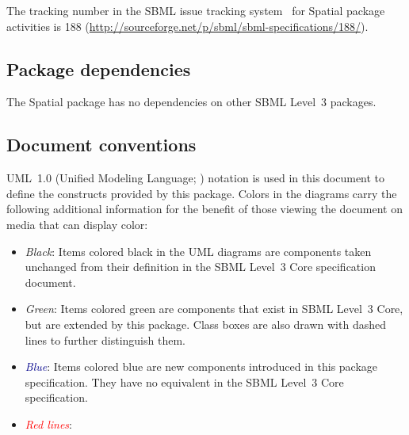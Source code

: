 The tracking number in the SBML issue tracking system~\citep{tracker} for Spatial package activities is 188 (\url{http://sourceforge.net/p/sbml/sbml-specifications/188/}).


\subsection{Package dependencies}

The Spatial package has no dependencies on other SBML Level~3 packages.


\subsection{Document conventions}
\label{conventions}

UML~1.0 (Unified Modeling Language; \citealt{eriksson:1998, oestereich:1999}) notation is used in this document to define the constructs provided by this package.  Colors in the diagrams carry the following additional information for the benefit of those viewing the document on media that can display color:

\begin{itemize}

\item[\raisebox{2.75pt}{\colorbox{black}{\rule{0.8pt}{0.8pt}}}]
  \emph{Black}: Items colored black in the UML diagrams are components
  taken unchanged from their definition in the SBML Level~3 Core
  specification document.

\item[\raisebox{2.75pt}{\colorbox{mediumgreen}{\rule{0.8pt}{0.8pt}}}]
  \emph{\textcolor{mediumgreen}{Green}}: Items colored green are
  components that exist in SBML Level~3 Core, but are extended by this
  package.  Class boxes are also drawn with dashed lines to further
  distinguish them.

\item[\raisebox{2.75pt}{\colorbox{darkblue}{\rule{0.8pt}{0.8pt}}}]
  \emph{\textcolor{darkblue}{Blue}}: Items colored blue are new
  components introduced in this package specification.  They have no
  equivalent in the SBML Level~3 Core specification.

\item[\raisebox{2.75pt}{\colorbox{red}{\rule{0.8pt}{0.8pt}}}]
  \emph{\textcolor{red}{Red lines}}: 

\end{itemize}

